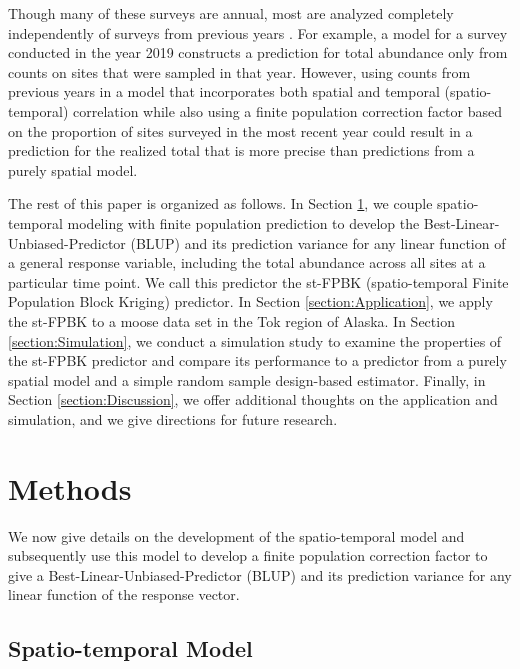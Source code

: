 \documentclass[]{interact}
\theoremstyle{plain}%
\theoremstyle{definition}
\theoremstyle{remark}
\begin{document}
Though many of these surveys are annual, most are analyzed completely
independently of surveys from previous years
\citep[e.g.][]{gasaway1986estimating, kellie_geospatial_2006, boertje2009managing, peters2014contrasting}.
For example, a model for a survey conducted in the year 2019 constructs
a prediction for total abundance only from counts on sites that were
sampled in that year. However, using counts from previous years in a
model that incorporates both spatial and temporal (spatio-temporal)
correlation while also using a finite population correction factor based
on the proportion of sites surveyed in the most recent year could result
in a prediction for the realized total that is more precise than
predictions from a purely spatial model.

The rest of this paper is organized as follows. In Section
\ref{section:Methods}, we couple spatio-temporal modeling with finite
population prediction to develop the Best-Linear-Unbiased-Predictor
(BLUP) and its prediction variance for any linear function of a general
response variable, including the total abundance across all sites at a
particular time point. We call this predictor the st-FPBK
(spatio-temporal Finite Population Block Kriging) predictor. In Section
\ref{section:Application}, we apply the st-FPBK to a moose data set in
the Tok region of Alaska. In Section \ref{section:Simulation}, we
conduct a simulation study to examine the properties of the st-FPBK
predictor and compare its performance to a predictor from a purely
spatial model and a simple random sample design-based estimator.
Finally, in Section \ref{section:Discussion}, we offer additional
thoughts on the application and simulation, and we give directions for
future research.

\section{Methods} \label{section:Methods}

We now give details on the development of the spatio-temporal model and
subsequently use this model to develop a finite population correction
factor to give a Best-Linear-Unbiased-Predictor (BLUP) and its
prediction variance for any linear function of the response vector.

\subsection{Spatio-temporal Model}
\end{document}
